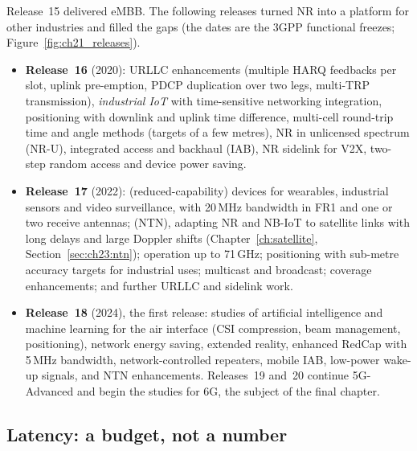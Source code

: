 Release~15 delivered eMBB. The following releases turned NR into a platform for other industries and
filled the gaps (the dates are the 3GPP functional freezes; Figure~\ref{fig:ch21_releases}).
\begin{itemize}
\item \textbf{Release~16} (2020): URLLC enhancements (multiple HARQ feedbacks per slot, uplink
pre-emption, PDCP duplication over two legs, multi-TRP transmission), \emph{industrial IoT} with
time-sensitive networking integration, positioning with downlink and uplink time difference,
multi-cell round-trip time and angle methods (targets of a few metres), NR in unlicensed spectrum
(NR-U), integrated access and backhaul (IAB), NR sidelink for V2X, two-step random access and device
power saving.
\item \textbf{Release~17} (2022):  (reduced-capability) devices for wearables,
industrial sensors and video surveillance, with 20\,MHz bandwidth in FR1 and one or two receive
antennas;  (NTN), adapting NR and NB-IoT to satellite links with long
delays and large Doppler shifts (Chapter~\ref{ch:satellite}, Section~\ref{sec:ch23:ntn}); operation
up to 71\,GHz; positioning with sub-metre accuracy targets for industrial uses; multicast and
broadcast; coverage enhancements; and further URLLC and sidelink work.

\item \textbf{Release~18} (2024), the first  release: studies of artificial
intelligence and machine learning for the air interface (CSI compression, beam management,
positioning), network energy saving, extended reality, enhanced RedCap with 5\,MHz bandwidth,
network-controlled repeaters, mobile IAB, low-power wake-up signals, and NTN enhancements.
Releases~19 and~20 continue 5G-Advanced and begin the studies for 6G, the subject of the final
chapter.
\end{itemize}

\subsection{Latency: a budget, not a number}

